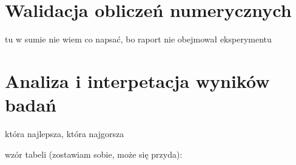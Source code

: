 \documentclass[peerreview]{IEEEtran}
\begin{document}
\section{Walidacja obliczeń numerycznych}
tu w sumie nie wiem co napsać, bo raport nie obejmował eksperymentu
 


\section{Analiza i interpetacja wyników badań}

która najlepsza, która najgorsza 


wzór tabeli (zostawiam sobie, może się przyda):
\end{document}
